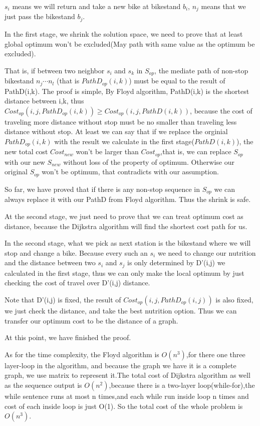 \documentclass[oneside]{homework} %
\begin{document}
$s_{i}$ means we will return and take a new bike at bikestand $b_{i}$, $n_{j}$ means that we just pass the bikestand $b_{j}$.

In the first stage, we shrink the solution space, we need to prove that at least global optimum won't be excluded(May path with same value as the optimum be excluded). 

That is, if between two neighbor $s_{i}$ and $s_{k}$ in $S_{op}$, the mediate path of non-stop bikestand $n_{j}  \cdots n_{l} $ (that is $PathD_{op}(i,k)$) must be equal to the result of PathD(i,k). The proof is simple, By Floyd algorithm, PathD(i,k) is the shortest distance between i,k, thus $Cost_{op}(i,j,PathD_{op}(i,k)) \geq Cost_{op}(i,j,PathD(i,k))$, because the cost of traveling more distance without stop must be no smaller than traveling less distance without stop. At least we can say that if we replace the orginial $PathD_{op}(i,k)$ with the result we calculate in the first stage($PathD(i,k)$), the new total cost $Cost_{new}$ won't be larger than $Cost_{op}$,that is, we can replace $S_{op}$ with our new $S_{new}$ without loss of the property of optimum. Otherwise our original $S_{op}$ won't be optimum, that contradicts with our assumption.

So far, we have proved that if there is any non-stop sequence in $S_{op}$ we can always replace it with our PathD from Floyd algorithm. Thus the shrink is safe. 

At the second stage, we just need to prove that we can treat optimum cost as distance, because the Dijkstra algorithm will find the shortest cost path for us. 

In the second stage, what we pick as next station is the bikestand where we will stop and change a bike. Because every such an $s_{i}$ we need to change our nutrition and the distance between two $s_{i}$ and $s_{j}$ is only determined by D'(i,j) we calculated in the first stage, thus we can only make the local optimum by just checking the cost of travel over D'(i,j) distance. 

Note that D'(i,j) is fixed, the result of $Cost_{op}(i,j,PathD_{op}(i,j))$ is also fixed, we just check the distance, and take the best nutrition option. Thus we can transfer our optimum cost to be the distance of a graph.

At this point, we have finished the proof. 

As for the time complexity, the Floyd algorithm is $O(n^{3})$,for there one three layer-loop in the algorithm, and because the graph we have it is a complete graph, we use matrix to represent it.The total cost of Dijkstra algorithm as well as the sequence output is $O(n^{2})$,because there is a two-layer loop(while-for),the while sentence runs at most n times,and each while run inside loop n times and cost of each inside loop is just O(1).  So the total cost of the whole problem is $O(n^{3})$.
\end{document}
